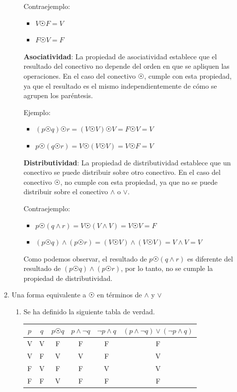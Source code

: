 \documentclass{article}
\begin{document}
\begin{enumerate}
\begin{enumerate}[label=(\alph*)]
\begin{enumerate}[label=(\alph*)]
  Contraejemplo:
  \begin{itemize}
    \item $V \astrosun F = V$
    \item $F \astrosun V = F$
  \end{itemize}

 

  \textbf{Asociatividad}: La propiedad de asociatividad establece que el resultado del conectivo no depende del orden en que se apliquen las operaciones. En el caso del conectivo $\astrosun$, cumple con esta propiedad, ya que el resultado es el mismo independientemente de cómo se agrupen los paréntesis.

  Ejemplo:
  \begin{itemize}
    \item $(p \astrosun q) \astrosun r = (V \astrosun V) \astrosun V = F \astrosun V = V$
    \item $p \astrosun (q \astrosun r) = V \astrosun (V \astrosun V) = V \astrosun F = V$
  \end{itemize}

  \textbf{Distributividad}: La propiedad de distributividad establece que un conectivo se puede distribuir sobre otro conectivo. En el caso del conectivo $\astrosun$, no cumple con esta propiedad, ya que no se puede distribuir sobre el conectivo $\land$ o $\lor$.

  Contraejemplo:
  \begin{itemize}
    \item $p \astrosun (q \land r) = V \astrosun (V \land V) = V \astrosun V = F$
    \item $(p \astrosun q) \land (p \astrosun r) = (V \astrosun V) \land (V \astrosun V) = V \land V = V$
  \end{itemize}

  Como podemos observar, el resultado de $p \astrosun (q \land r)$ es diferente del resultado de $(p \astrosun q) \land (p \astrosun r)$, por lo tanto, no se cumple la propiedad de distributividad.
\end{enumerate}

    
    \item Una forma equivalente a $\astrosun$ en términos de  $\land$ y $\lor$

    \begin{enumerate}
    \item Se ha definido la siguiente tabla de verdad.
    
    \begin{tabular}{|c|c|c|c|c|c|}
        \hline
        $p$ & $q$ & $p \astrosun q$ & $p \land \neg q$ & $\neg p \land q$ & $(p \land \neg q) \lor (\neg p \land q)$ \\
        \hline
        V & V & F & F & F & F \\
        V & F & V & V & F & V \\
        F & V & F & F & V & V \\
        F & F & V & F & F & F \\
        \hline
    \end{tabular}
    

\end{enumerate}
\end{enumerate}
\end{enumerate}
\end{document}
